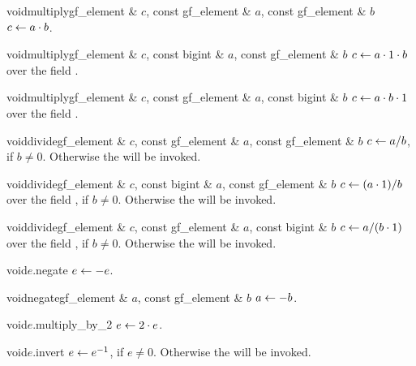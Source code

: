 \begin{fcode}{void}{multiply}{gf_element & $c$, const gf_element & $a$, const gf_element & $b$}
  $c \leftarrow a \cdot b$.
\end{fcode}

\begin{fcode}{void}{multiply}{gf_element & $c$, const bigint & $a$, const gf_element & $b$}
  $c \leftarrow a \cdot 1 \cdot b$ over the field .
\end{fcode}

\begin{fcode}{void}{multiply}{gf_element & $c$, const gf_element & $a$, const bigint & $b$}
  $c \leftarrow a \cdot b \cdot 1$ over the field .
\end{fcode}

\begin{fcode}{void}{divide}{gf_element & $c$, const gf_element & $a$, const gf_element & $b$}
  $c \leftarrow a / b$, if $b \neq 0$.  Otherwise the \LEH will be invoked.
\end{fcode}

\begin{fcode}{void}{divide}{gf_element & $c$, const bigint & $a$, const gf_element & $b$}
  $c \leftarrow (a \cdot 1) / b$ over the field , if $b \neq 0$.  Otherwise the \LEH
  will be invoked.
\end{fcode}

\begin{fcode}{void}{divide}{gf_element & $c$, const gf_element & $a$, const bigint & $b$}
  $c \leftarrow a / (b \cdot 1)$ over the field , if $b \neq 0$.  Otherwise the \LEH
  will be invoked.
\end{fcode}

\begin{fcode}{void}{$e$.negate}{}
  $e \leftarrow -e$.
\end{fcode}

\begin{fcode}{void}{negate}{gf_element & $a$, const gf_element & $b$}
  $a \leftarrow -b$.
\end{fcode}

\begin{fcode}{void}{$e$.multiply_by_2}{}
  $e \leftarrow 2 \cdot e$.
\end{fcode}

\begin{fcode}{void}{$e$.invert}{}
  $e \leftarrow e^{-1}$, if $e \neq 0$.
Otherwise the \LEH will be invoked.
\end{fcode}

